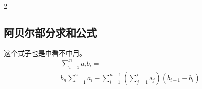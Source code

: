 \documentclass[8pt,a4paper]{article}
\begin{document}
\begin{multicols}{2}
    \subsection{阿贝尔部分求和公式}
    这个式子也是中看不中用。
    \begin{align*}
        &\sum_{i=1}^{n} a_i b_i = \\
        &b_n \sum_{i=1}^{n} a_i - \sum_{i=1}^{n-1} \left(\sum_{j=1}^{i} a_j\right) (b_{i+1} - b_i)
    \end{align*}

\end{multicols}
\end{document}
